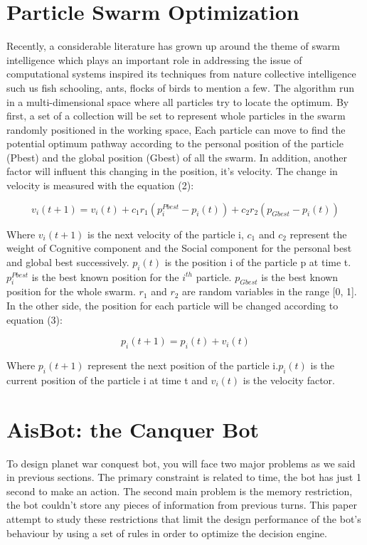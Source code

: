 \documentclass[]{interact}
\theoremstyle{plain}%
\theoremstyle{definition}
\theoremstyle{remark}
\begin{document}
\section{Particle Swarm Optimization}
Recently, a considerable literature has grown up around the theme of swarm intelligence which plays an important role in addressing the issue of computational systems inspired its techniques from nature collective\cite{clever} intelligence such us fish schooling, ants, flocks of birds to mention a few. The algorithm run in a multi-dimensional space where all particles try to locate the optimum\cite{clever}. By first, a set of a collection will be set to represent whole particles in the swarm randomly positioned in the working space, Each particle can move to find the potential optimum pathway according to the personal position of the particle (Pbest)  and the global position (Gbest) of all the swarm. In addition, another factor will influent this changing in the position, it's velocity. The change in velocity is measured with the equation (2):

\begin{equation}
v_{i}(t+1) = v_{i}(t) + c_{1}r_{1}(p_{i}^{Pbest}-p_{i}(t))  + c_{2}r_{2}(p_{Gbest}-p_{i}(t))
\end{equation}

Where $v_{i}(t+1)$ is the next velocity of the particle i, $c_{1}$ and $c_{2}$ represent the weight of Cognitive component and the Social component  for the personal best and global best successively. $p_{i}(t)$ is the position i of the particle p at time t. $p_{i}^{Pbest}$ is the best known position for the $i^{th}$ particle. $p_{Gbest}$ is the best known position for the whole swarm. $r_{1}$ and $r_{2}$ are random variables in the range [0, 1]. In the other side, the position for each particle  will be changed according to equation (3):

\begin{equation}
p_{i}(t+1) = p_{i}(t) + v_{i}(t)
\end{equation}

Where $p_{i}(t+1)$ represent the next position of the particle i.$p_{i}(t)$ is the current position of the particle i at time t and $v_{i}(t)$ is the velocity factor.

\section{AisBot: the Canquer Bot}

To design planet war conquest bot, you will face two major problems as we said in previous sections. The primary constraint is related to time, the bot has just 1 second to make an action. The second main problem is the memory restriction, the bot couldn't store any pieces of information from previous turns. This paper attempt to study these restrictions that limit the design performance of the bot's behaviour by using a set of rules in order to optimize the decision engine. \\
\end{document}
